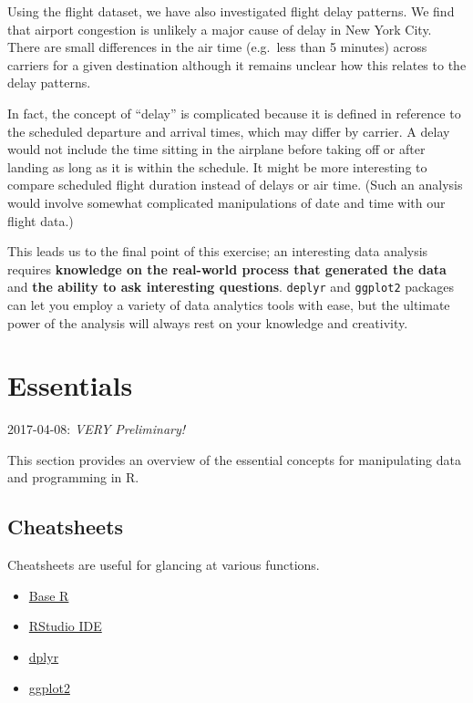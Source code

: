 \documentclass[]{book}
\theoremstyle{definition}
\theoremstyle{definition}
\theoremstyle{remark}
\begin{document}
Using the flight dataset, we have also investigated flight delay
patterns. We find that airport congestion is unlikely a major cause of
delay in New York City. There are small differences in the air time
(e.g.~less than 5 minutes) across carriers for a given destination
although it remains unclear how this relates to the delay patterns.

In fact, the concept of ``delay'' is complicated because it is defined
in reference to the scheduled departure and arrival times, which may
differ by carrier. A delay would not include the time sitting in the
airplane before taking off or after landing as long as it is within the
schedule. It might be more interesting to compare scheduled flight
duration instead of delays or air time. (Such an analysis would involve
somewhat complicated manipulations of date and time with our flight
data.)

This leads us to the final point of this exercise; an interesting data
analysis requires \textbf{knowledge on the real-world process that
generated the data} and \textbf{the ability to ask interesting
questions}. \texttt{deplyr} and \texttt{ggplot2} packages can let you
employ a variety of data analytics tools with ease, but the ultimate
power of the analysis will always rest on your knowledge and creativity.

\chapter{Essentials}\label{essentials}

2017-04-08: {\emph{VERY Preliminary!}}

This section provides an overview of the essential concepts for
manipulating data and programming in R.

\section{Cheatsheets}\label{cheatsheets}

Cheatsheets are useful for glancing at various functions.

\begin{itemize}
\item
  \href{http://github.com/rstudio/cheatsheets/raw/master/source/pdfs/base-r.pdf}{Base
  R}
\item
  \href{https://www.rstudio.com/wp-content/uploads/2016/01/rstudio-IDE-cheatsheet.pdf}{RStudio
  IDE}
\item
  \href{https://github.com/rstudio/cheatsheets/raw/master/source/pdfs/data-transformation-cheatsheet.pdf}{dplyr}
\item
  \href{https://www.rstudio.com/wp-content/uploads/2016/11/ggplot2-cheatsheet-2.1.pdf}{ggplot2}
\end{itemize}
\end{document}
